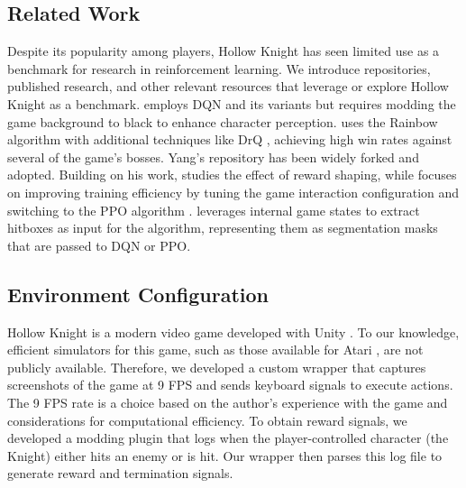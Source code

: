 \subsection{Related Work} \label{sec:hollow-knight-review}
Despite its popularity among players, Hollow Knight has seen limited use as a benchmark for research in reinforcement learning.
We introduce repositories, published research, and other relevant resources that leverage or explore Hollow Knight as a benchmark.
\citet{cui_ailec0623dqn_hollowknight_2021} employs DQN \citep{mnih_human-level_2015} and its variants but requires modding the game background to black to enhance character perception.
\citet{yang_seermerhollowknight_rl_2023} uses the Rainbow algorithm \citep{hessel_rainbow_2017} with additional techniques like DrQ \citep{yarats_mastering_2021, kostrikov_image_2021}, achieving high win rates against several of the game’s bosses.
Yang's repository has been widely forked and adopted.
Building on his work, \citet{lee_adapting_2023} studies the effect of reward shaping, while \citet{sun_moapacharl-hollowknight-zote_2024} focuses on improving training efficiency by tuning the game interaction configuration and switching to the PPO algorithm \citep{schulman_proximal_2017}.
\citet{jain_adityajain1030hkrl_2024} leverages internal game states to extract hitboxes as input for the algorithm, representing them as segmentation masks that are passed to DQN or PPO.

\subsection{Environment Configuration} \label{sec:HK-exp-dev}
Hollow Knight is a modern video game developed with Unity \citep{unity_2005}. 
To our knowledge, efficient simulators for this game, such as those available for Atari \citep{brockman_openai_2016, towers_gymnasium_2023}, are not publicly available. 
Therefore, we developed a custom wrapper that captures screenshots of the game at 9 FPS and sends keyboard signals to execute actions.
The 9 FPS rate is a choice based on the author's experience with the game and considerations for computational efficiency.
To obtain reward signals, we developed a modding plugin \citep{hk-moddingapi_2017} that logs when the player-controlled character (the Knight) either hits an enemy or is hit. 
Our wrapper then parses this log file to generate reward and termination signals.

